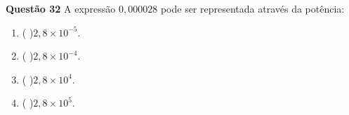 {\bf Questão 32} 
A expressão $0,000028$ pode ser representada através da potência:
\begin{multicols}{2}
\begin{enumerate}
		\item ( )$ 2,8 \times 10^{-5}$.
		\item ( )$ 2,8 \times 10^{-4}$.
\item ( )$ 2,8 \times 10^4$.
\item ( )$ 2,8 \times 10^5$.
\end{enumerate}
\end{multicols}

